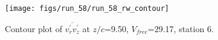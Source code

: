 \begin{figure}[H]
\centering
\texttt{[image: figs/run\_58/run\_58\_rw\_contour]}
\caption{Contour plot of $\overline{v_{r}^{\prime} v_{z}^{\prime}}$ at $z/c$=9.50, $V_{free}$=29.17, station 6.}
\label{fig:run_58_rw_contour}
\end{figure}


